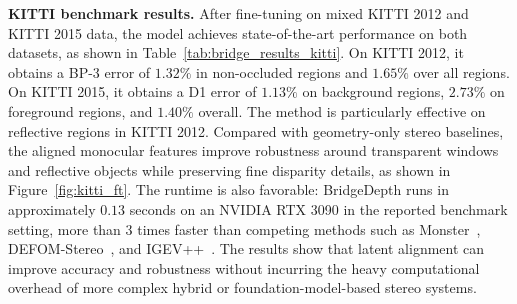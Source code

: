 \noindent\textbf{KITTI benchmark results.} After fine-tuning on mixed KITTI 2012 and KITTI 2015 data, the model achieves state-of-the-art performance on both datasets, as shown in Table~\ref{tab:bridge_results_kitti}.
On KITTI 2012, it obtains a BP-3 error of $1.32\%$ in non-occluded regions and $1.65\%$ over all regions. 
On KITTI 2015, it obtains a D1 error of $1.13\%$ on background regions, $2.73\%$ on foreground regions, and $1.40\%$ overall.
The method is particularly effective on reflective regions in KITTI 2012.
Compared with geometry-only stereo baselines, the aligned monocular features improve robustness around transparent windows and reflective objects while preserving fine disparity details, as shown in Figure~\ref{fig:kitti_ft}.
The runtime is also favorable: BridgeDepth runs in approximately $0.13$ seconds on an NVIDIA RTX 3090 in the reported benchmark setting, more than $3$ times faster than competing methods such as Monster~\cite{cheng2025monster}, DEFOM-Stereo~\cite{jiang2025defom}, and IGEV++~\cite{xu2024igev++}.
The results show that latent alignment can improve accuracy and robustness without incurring the heavy computational overhead of more complex hybrid or foundation-model-based stereo systems.

